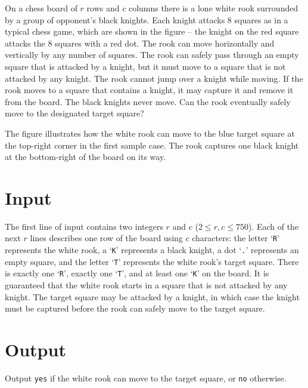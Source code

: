
On a chess board of $r$ rows and $c$ columns there is a lone white rook surrounded by a group of opponent's black knights.
Each knight attacks $8$ squares as in a typical chess game, which are shown in the figure -- the knight on the red square attacks the $8$ squares with a red dot.
The rook can move horizontally and vertically by any number of squares.
The rook can safely pass through an empty square that is attacked by a knight, but it must move to a square that is not attacked by any knight.
The rook cannot jump over a knight while moving.
If the rook moves to a square that contains a knight, it may capture it and remove it from the board.
The black knights never move.
Can the rook eventually safely move to the designated target square?

The figure illustrates how the white rook can move to the blue target square at the top-right corner in the first sample case.
The rook captures one black knight at the bottom-right of the board on its way.

\section*{Input}
The first line of input contains two integers $r$ and $c$ ($2 \leq r, c \leq 750$).
Each of the next $r$ lines describes one row of the board using $c$ characters: the letter `{\tt R}' represents the white rook, a `{\tt K}' represents a black knight,
a dot `{\tt .}' represents an empty square, and the letter `{\tt T}' represents the white rook's target square.
There is exactly one `{\tt R}', exactly one `{\tt T}', and at least one `{\tt K}' on the board.
It is guaranteed that the white rook starts in a square that is not attacked by any knight.
The target square may be attacked by a knight, in which case the knight must be captured before the rook can safely move to the target square.

\section*{Output}
Output {\tt yes} if the white rook can move to the target square, or {\tt no} otherwise.
